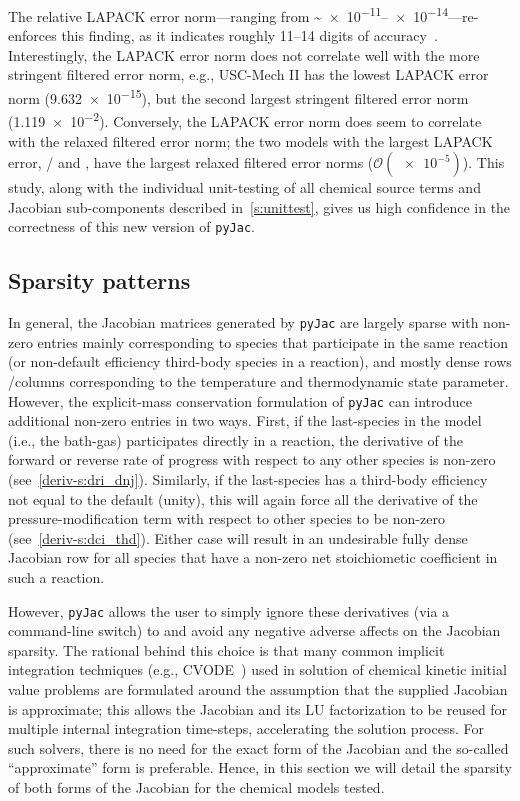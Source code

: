 \documentclass[12pt,number,sort&compress,preprint]{elsarticle}
\begin{document}
The relative LAPACK error norm---ranging from \textasciitilde\numrange{e-11}{e-14}---re-enforces this finding, as it indicates roughly \numrange{11}{14} digits of accuracy~\cite{Anderson:1999aa}.
Interestingly, the LAPACK error norm does not correlate well with the more stringent filtered error norm, e.g., USC-Mech II has the lowest LAPACK error norm (\num{9.632e-15}), but the second largest stringent filtered error norm (\num{1.119e-2}).
Conversely, the LAPACK error norm does seem to correlate with the relaxed filtered error norm; the two models with the largest LAPACK error, \slash{} and , have the largest relaxed filtered error norms ($\mathcal{O}(\num{e-5})$).
This study, along with the individual unit-testing of all chemical source terms and Jacobian sub-components described in~\cref{s:unittest}, gives us high confidence in the correctness of this new version of \texttt{pyJac}.


\subsection{Sparsity patterns}
\label{S:sparsity}

In general, the Jacobian matrices generated by \texttt{pyJac} are largely sparse with non-zero entries mainly corresponding to species that participate in the same reaction (or non-default efficiency third-body species in a reaction), and mostly dense rows \slash columns corresponding to the temperature and thermodynamic state parameter.
However, the explicit-mass conservation formulation of \texttt{pyJac} can introduce additional non-zero entries in two ways.
First, if the last-species in the model (i.e., the bath-gas) participates directly in a reaction, the derivative of the forward or reverse rate of progress with respect to any other species is non-zero (see~\cref{deriv-s:dri_dnj}).
Similarly, if the last-species has a third-body efficiency not equal to the default (unity), this will again force all the derivative of the pressure-modification term with respect to other species to be non-zero (see~\cref{deriv-s:dci_thd}).
Either case will result in an undesirable fully dense Jacobian row for all species that have a non-zero net stoichiometic coefficient in such a reaction.

However, \texttt{pyJac} allows the user to simply ignore these derivatives (via a command-line switch) to and avoid any negative adverse affects on the Jacobian sparsity.
The rational behind this choice is that many common implicit integration techniques (e.g., CVODE~\cite{cvode:2.8.2}) used in solution of chemical kinetic initial value problems are formulated around the assumption that the supplied Jacobian is approximate; this allows the Jacobian and its LU factorization to be reused for multiple internal integration time-steps, accelerating the solution process.
For such solvers, there is no need for the exact form of the Jacobian and the so-called ``approximate'' form is preferable.
Hence, in this section we will detail the sparsity of both forms of the Jacobian for the chemical models tested.
\end{document}

